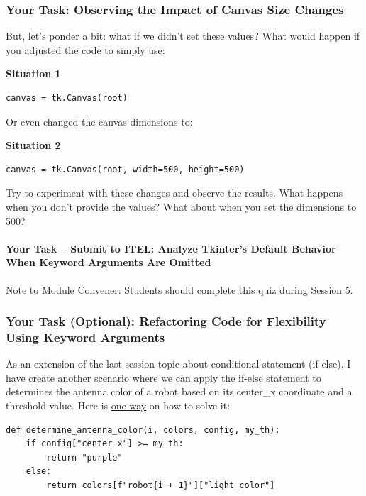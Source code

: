 \subsubsection{Your Task: Observing the Impact of Canvas Size Changes}
But, let's ponder a bit: what if we didn't set these values? What would happen if you adjusted the code to simply use:

\noindent
\textbf{Situation 1}
\begin{verbatim}
canvas = tk.Canvas(root)
\end{verbatim}

\noindent
Or even changed the canvas dimensions to:

\noindent\textbf{Situation 2}
\begin{verbatim}
canvas = tk.Canvas(root, width=500, height=500)
\end{verbatim}

\noindent
Try to experiment with these changes and observe the results. What happens when you don't provide the values? What about when you set the dimensions to 500?

\paragraph{Your Task – Submit to ITEL: Analyze Tkinter's Default Behavior When Keyword Arguments Are Omitted} 

Note to Module Convener: Students should complete this quiz during Session 5.

\subsubsection{Your Task (Optional): Refactoring Code for Flexibility Using Keyword Arguments}

As an extension of the last session topic about conditional statement (if-else), I have create another scenario where we can apply the if-else statement to determines the antenna color of a robot based on its center\_x coordinate and a threshold value. Here is \href{https://github.com/balandongiv/computer_programming_gist/blob/main/session5/session5_robot_template.py#L43}{one way} on how to solve it:

\begin{verbatim}
def determine_antenna_color(i, colors, config, my_th):
    if config["center_x"] >= my_th:
        return "purple"
    else:
        return colors[f"robot{i + 1}"]["light_color"]
\end{verbatim}

